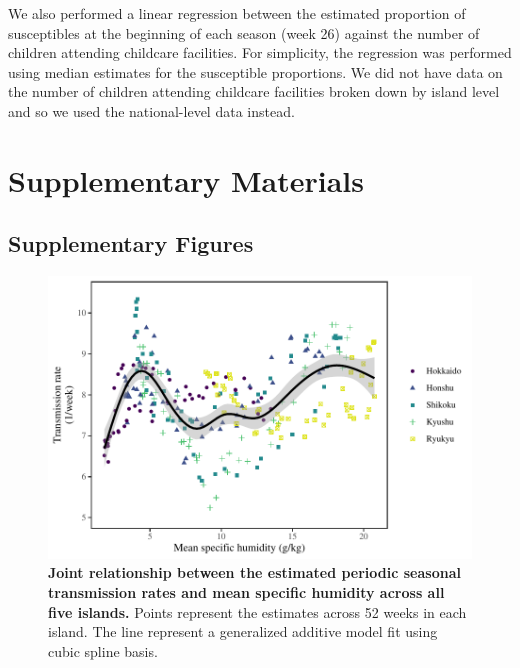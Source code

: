 \documentclass[12pt]{article}
\begin{document}
We also performed a linear regression between the estimated proportion of susceptibles at the beginning of each season (week 26) against the number of children attending childcare facilities.
For simplicity, the regression was performed using median estimates for the susceptible proportions.
We did not have data on the number of children attending childcare facilities broken down by island level and so we used the national-level data instead.

\pagebreak

\setcounter{figure}{0}
\setcounter{equation}{0}
\renewcommand{\thefigure}{S\arabic{figure}}
\renewcommand{\theequation}{S\arabic{equation}}

\section*{Supplementary Materials}

\subsection*{Supplementary Figures}

\begin{figure}[!th]
\includegraphics[width=\textwidth]{../figure/figure_joint_climate.pdf}
\caption{
\textbf{Joint relationship between the estimated periodic seasonal transmission rates and mean specific humidity across all five islands.}
Points represent the estimates across 52 weeks in each island.
The line represent a generalized additive model fit using cubic spline basis.
}
\label{fig:fig2}
\end{figure}

\pagebreak


\end{document}
